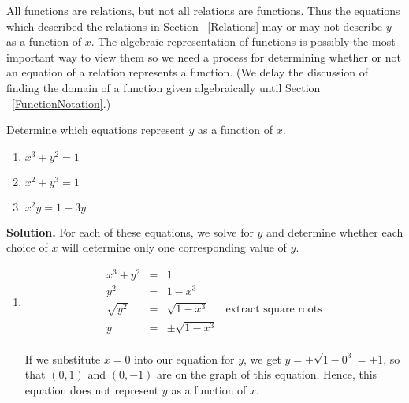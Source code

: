 All functions are relations, but not all relations are functions.  Thus the equations which described the relations in Section \hspace{-.1in} ~\ref{Relations} may or may not describe $y$ as a function of $x$.  The algebraic representation of functions is possibly the most important way to view them so we need a process for determining whether or not an equation of a relation represents a function.  (We delay the discussion of finding the domain of a function given algebraically until Section \hspace{-.1in} ~\ref{FunctionNotation}.)

\begin{ex}  Determine which equations represent $y$ as a function of $x$.  \label{introfunctionlastexample}

\begin{multicols}{3}

\begin{enumerate}

\item $x^3 + y^2 = 1$

\item $x^2 + y^3 = 1$

\item  $x^2y = 1 - 3y$

\end{enumerate}

\end{multicols}

\medskip

{\bf Solution.}  For each of these equations, we solve for $y$ and determine whether each choice of $x$ will determine only one corresponding value of $y$.

\setlength{\extrarowheight}{2pt}

\begin{enumerate}

\item  \[ \begin{array}{rclr} 
         x^3 + y^2 & = & 1 & \\
               y^2 & = & 1 - x^3 & \\
        \sqrt{y^2} & = & \sqrt{1 - x^3} & \mbox{extract square roots} \\
                 y & = & \pm \sqrt{1 - x^3} & \\ 
        \end{array} \]

If we substitute $x=0$ into our equation for $y$, we get  $y = \pm \sqrt{1 - 0^3} = \pm 1$, so that $(0,1)$ and $(0,-1)$ are on the graph of this equation. Hence, this equation does not represent $y$ as a function of $x$.


\end{enumerate}
\end{ex}
